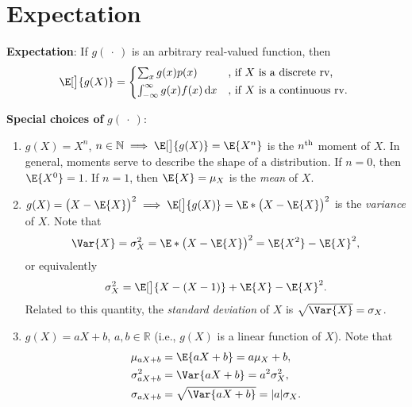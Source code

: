 \section*{Expectation}
\begin{Regular}
    \textbf{Expectation}: If $ g(\:\cdot\:) $ is an arbitrary real-valued function, then
    \[ \E[\big]{g(X)}=\begin{cases*}
            \sum_{x}g(x)p(x)                        & , if $ X $ is a discrete rv,   \\
            \int_{-\infty}^{\infty}g(x)f(x)\odif{x} & , if $ X $ is a continuous rv.
        \end{cases*} \]
\end{Regular}
\begin{Regular}
    \textbf{Special choices of} $ g(\:\cdot\:) $:
    \begin{enumerate}[1.]
        \item $ g(X)=X^n $, $ n\in\mathbb{N}\implies \E[\big]{g(X)}=\E{X^n} $ is the $ n\textsuperscript{th} $ moment of $ X $. In general,
              moments serve to describe the shape of a distribution. If $ n=0 $, then $ \E{X^0}=1 $. If $ n=1 $, then $ \E{X}=\mu_X $ is the \emph{mean} of $ X $.
        \item $ g(X)=\bigl(X-\E{X}\bigr)^2\implies \E[\big]{g(X)}=\E*{\bigl(X-\E{X}\bigr)^2} $ is the \emph{variance} of $ X $. Note that
              \[ \Var{X}=\sigma_X^2=\E*{\bigl(X-\E{X}\bigr)^2}=\E{X^2}-\E{X}^2, \]
              or equivalently
              \[ \sigma_X^2=\E[\big]{X-(X-1)}+\E{X}-\E{X}^2. \]
              Related to this quantity, the \emph{standard deviation} of $ X $ is $ \sqrt{\Var{X}}=\sigma_X $.
        \item $ g(X)=aX+b $, $ a,b\in\mathbb{R} $ (i.e., $ g(X) $ is a linear function of $ X $). Note that
              \begin{align*}
                  \mu_{aX+b}      & =\E{aX+b}=a \mu_X+b,                \\
                  \sigma^2_{aX+b} & =\Var{aX+b}=a^2 \sigma_X^2,         \\
                  \sigma_{aX+b}   & =\sqrt{\Var{aX+b}}=\abs{a}\sigma_X.
              \end{align*}
    \end{enumerate}
\end{Regular}
